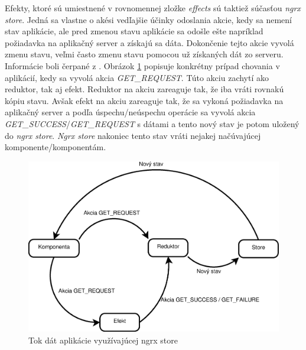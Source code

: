 Efekty, ktoré sú umiestnené v rovnomennej zložke \textit{effects} sú taktiež súčasťou \textit{ngrx store}. Jedná sa vlastne o akési vedľajšie účinky odoslania akcie, kedy sa nemení stav aplikácie, ale pred zmenou stavu aplikácie sa odošle ešte napríklad požiadavka na aplikačný server a získajú sa dáta. Dokončenie tejto akcie vyvolá zmenu stavu, veľmi často zmenu stavu pomocou už získaných dát zo serveru. Informácie boli čerpané z \cite{pzU1UYWXatJMcZgL}. Obrázok \ref{fig:ngrx} popisuje konkrétny prípad chovania v aplikácií, kedy sa vyvolá akcia \textit{GET\_REQUEST}. Túto akciu zachytí ako reduktor, tak aj efekt. Reduktor na akciu zareaguje tak, že iba vráti rovnakú kópiu stavu. Avšak efekt na akciu zareaguje tak, že sa vykoná požiadavka na aplikačný server a podľa úspechu/neúspechu operácie sa vyvolá akcia \textit{GET\_SUCCESS}/\textit{GET\_REQUEST} s dátami a tento nový stav je potom uložený do \textit{ngrx store}. \textit{Ngrx store} nakoniec tento stav vráti nejakej načúvajúcej komponente/komponentám. 
\begin{figure}[h]
  \centering
  \includegraphics[scale=0.4]{fig/ngrx-efekt.eps}
  \caption{Tok dát aplikácie využívajúcej ngrx store}
  \label{fig:ngrx}
\end{figure}

